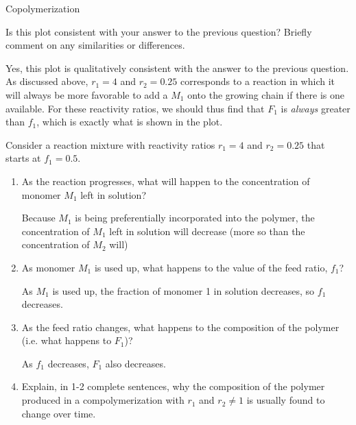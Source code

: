 \begin{activity}{Copolymerization}
\begin{ctqs}
		Is this plot consistent with your answer to the previous question?  Briefly comment on any similarities or differences.
				
		\begin{solution}[1.5in]{}
			Yes, this plot is qualitatively consistent with the answer to the previous question.  As discussed above, $r_1=4$ and $r_2=0.25$ corresponds to a reaction in which it will always be more favorable to add a $M_1$ onto the growing chain if there is one available.  For these reactivity ratios, we should thus find that $F_1$ is \emph{always} greater than $f_1$, which is exactly what is shown in the plot.
		\end{solution}
		
	\question Consider a reaction mixture with reactivity ratios $r_1 = 4$ and $r_2=0.25$ that starts at $f_1=0.5$. \label{\labelbase:ctq:compositionshift}
	
		\begin{enumerate}
			
			\item As the reaction progresses, what will happen to the concentration of monomer $M_1$ left in solution?
				
				\begin{solution}[0.5in]{}
					Because $M_1$ is being preferentially incorporated into the polymer, the concentration of $M_1$ left in solution will decrease (more so than the concentration of $M_2$ will)
				\end{solution}
				
			\item As monomer $M_1$ is used up, what happens to the value of the feed ratio, $f_1$?
				
				\begin{solution}[0.5in]{}
					As $M_1$ is used up, the fraction of monomer 1 in solution decreases, so $f_1$ decreases.
				\end{solution}
			
			\item As the feed ratio changes, what happens to the composition of the polymer (i.e. what happens to $F_1$)?
			
				\begin{solution}[0.5in]{}
					As $f_1$ decreases, $F_1$ also decreases.
				\end{solution}
			
			\item Explain, in 1-2 complete sentences, why the composition of the polymer produced in a compolymerization with $r_1$ and $r_2 \neq 1$ is usually found to change over time.
			

\end{enumerate}
\end{ctqs}
\end{activity}
